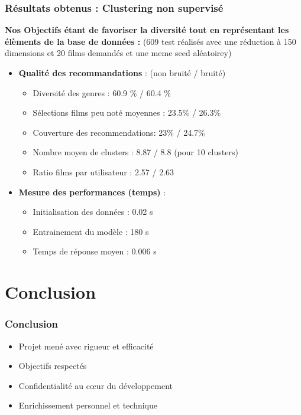 \documentclass{beamer}
\begin{document}
\begin{frame}
    \frametitle{Résultats obtenus : Clustering non supervisé}
    \scriptsize
    \textbf{Nos Objectifs étant de favoriser la diversité tout en représentant les élèments de la base de données  :}
    (609 test réalisés avec une réduction à 150 dimensions et 20 films demandés et une meme seed aléatoirey)
    \vspace{0.3cm}
    \begin{itemize}
        \item \textbf{Qualité des recommandations} : (non bruité / bruité)

              \begin{itemize}
                  \item Diversité des genres : 60.9 \% / 60.4 \%
                  \item Sélections films peu noté moyennes : 23.5\% / 26.3\%
                  \item Couverture des recommendations: 23\% / 24.7\%
                  \item Nombre moyen de clusters : 8.87 / 8.8 (pour 10 clusters)
                  \item Ratio films par utilisateur : 2.57 / 2.63
              \end{itemize}
        \item \textbf{Mesure des performances (temps)} :
              \begin{itemize}
                  \item Initialisation des données :  0.02 s
                  \item Entrainement du modèle : 180 s
                  \item Temps de réponse moyen : 0.006 s
              \end{itemize}
    \end{itemize}
\end{frame}



\section{Conclusion}
\begin{frame}
    \frametitle{Conclusion}
    \begin{itemize}
        \item Projet mené avec rigueur et efficacité
        \item Objectifs respectés
        \item Confidentialité au cœur du développement
        \item Enrichissement personnel et technique
    \end{itemize}
\end{frame}
\end{document}
